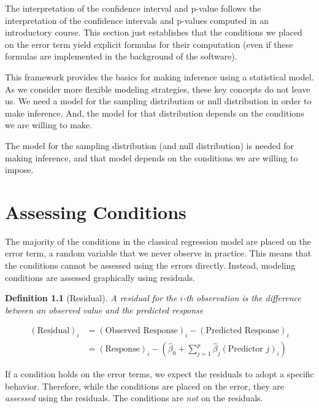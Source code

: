 \documentclass[
]{book}
\theoremstyle{plain}
\theoremstyle{mydefn}
\newtheorem{definition}{Definition}[chapter]
\theoremstyle{myexmpl}
\theoremstyle{remark}
\begin{document}
The interpretation of the confidence interval and p-value follows the interpretation of the confidence intervals and p-values computed in an introductory course. This section just establishes that the conditions we placed on the error term yield explicit formulas for their computation (even if these formulas are implemented in the background of the software).

This framework provides the basics for making inference using a statistical model. As we consider more flexible modeling strategies, these key concepts do not leave us. We need a model for the sampling distribution or null distribution in order to make inference. And, the model for that distribution depends on the conditions we are willing to make.

\begin{rmdkeyidea}
The model for the sampling distribution (and null distribution) is needed for making inference, and that model depends on the conditions we are willing to impose.
\end{rmdkeyidea}

\hypertarget{glm-assessing-conditions}{%
\chapter{Assessing Conditions}\label{glm-assessing-conditions}}

The majority of the conditions in the classical regression model are placed on the error term, a random variable that we never observe in practice. This means that the conditions cannot be assessed using the errors directly. Instead, modeling conditions are assessed graphically using residuals.

\begin{definition}[Residual]
\protect\hypertarget{def:defn-residual}{}{\label{def:defn-residual} {} }A residual for the \(i\)-th observation is the difference between an observed value and the predicted response

\[
\begin{aligned}
  (\text{Residual})_i 
    &= (\text{Observed Response})_i - (\text{Predicted Response})_i \\
    &= (\text{Response})_i - \left(\widehat{\beta}_0 + \sum_{j=1}^{p} \widehat{\beta}_j (\text{Predictor } j)_i\right)
\end{aligned}
\]
\end{definition}

\begin{rmdkeyidea}
If a condition holds on the error terms, we expect the residuals to adopt a specific behavior. Therefore, while the conditions are placed on the error, they are \emph{assessed} using the residuals. The conditions are \emph{not} on the residuals.\\
\end{rmdkeyidea}
\end{document}
